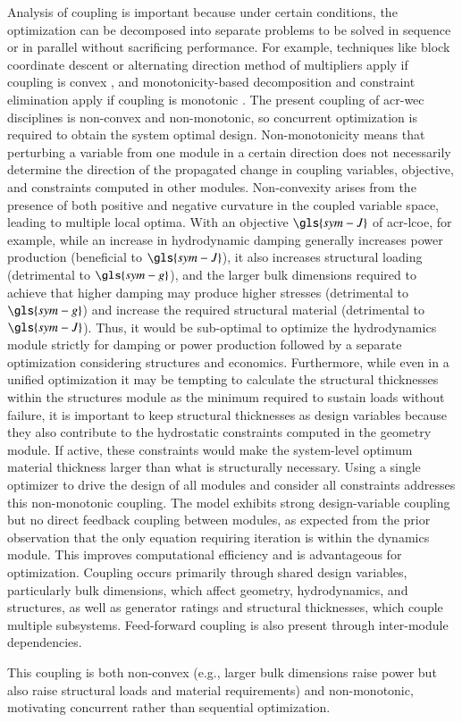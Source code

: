     Analysis of coupling is important because under certain conditions, the optimization can be decomposed into separate problems to be solved in sequence or in parallel without sacrificing performance.
    For example, techniques like block coordinate descent or alternating direction method of multipliers apply if coupling is convex \citep{wright_coordinate_2015}, and monotonicity-based decomposition and constraint elimination apply if coupling is monotonic \citep{azarm_monotonicity-based_1988,papalambros_principles_2017}.
    The present coupling of \gls{acr-wec} disciplines is non-convex and non-monotonic, so concurrent optimization is required to obtain the system optimal design.
    Non-monotonicity means that perturbing a variable from one module in a certain direction does not necessarily determine the direction of the propagated change in coupling variables, objective, and constraints computed in other modules.
    Non-convexity arises from the presence of both positive and negative curvature in the coupled variable space, leading to multiple local optima.
    With an objective $\gls{sym-J}$ of \gls{acr-lcoe}, for example, while an increase in hydrodynamic damping generally increases power production (beneficial to $\gls{sym-J}$), it also increases structural loading (detrimental to $\gls{sym-g}$), and the larger bulk dimensions required to achieve that higher damping may produce higher stresses (detrimental to $\gls{sym-g}$) and increase the required structural material (detrimental to $\gls{sym-J}$).
    Thus, it would be sub-optimal to optimize the hydrodynamics module strictly for damping or power production followed by a separate optimization considering structures and economics.
    Furthermore, while even in a unified optimization it may be tempting to calculate the structural thicknesses within the structures module as the minimum required to sustain loads without failure, it is important to keep structural thicknesses as design variables because they also contribute to the hydrostatic constraints computed in the geometry module.
    If active, these constraints would make the system-level optimum material thickness larger than what is structurally necessary.
    Using a single optimizer to drive the design of all modules and consider all constraints addresses this non-monotonic coupling. 
\else
    The model exhibits strong design-variable coupling but no direct feedback coupling between modules, as expected from the prior observation that the only equation requiring iteration is within the dynamics module.
    This improves computational efficiency and is advantageous for optimization.
    Coupling occurs primarily through shared design variables, particularly bulk dimensions, which affect geometry, hydrodynamics, and structures, as well as generator ratings and structural thicknesses, which couple multiple subsystems.
    Feed-forward coupling is also present through inter-module dependencies.
    
    This coupling is both non-convex (e.g., larger bulk dimensions raise power but also raise structural loads and material requirements) and non-monotonic, motivating concurrent rather than sequential optimization.
\fi
